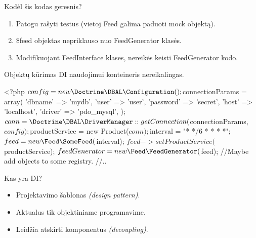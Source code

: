 \documentclass[12pt,a4paper]{beamer}
\begin{document}
\begin{frame}[fragile]{Kodėl šis kodas geresnis?}
\begin{enumerate}
    \item Patogu rašyti testus (vietoj Feed galima paduoti mock objektą).
    \item \$feed objektas nepriklauso nuo FeedGenerator klasės.
    \item Modifikuojant FeedInterface klases, nereikės keisti FeedGenerator kodo.
\end{enumerate}
\end{frame}

\begin{frame}[fragile]{Objektų kūrimas}
    DI naudojimui konteineris nereikalingas.
    \vskip0.5cm
\begin{phpcode}
    <?php
    $config = new \Doctrine\DBAL\Configuration();
    $connectionParams = array(
        'dbname' => 'mydb',
        'user' => 'user',
        'password' => 'secret',
        'host' => 'localhost',
        'driver' => 'pdo_mysql',
    );
    $conn = \Doctrine\DBAL\DriverManager::getConnection(
        $connectionParams, $config);
    $productService = new Product($conn);
    $interval = "* */6 * * * *";
    $feed = new \Feed\SomeFeed($interval);
    $feed->setProductService($productService);
    $feedGenerator = new \Feed\FeedGenerator($feed);
    //Maybe add objects to some registry.
    //..

\end{phpcode}
\end{frame}

\begin{frame}{Kas yra DI?}
    \begin{itemize}
        \item Projektavimo šablonas \emph{(design pattern)}.
        \item Aktualus tik objektiniame programavime.
        \item Leidžia atskirti komponentus \emph{(decoupling)}.
    \end{itemize}
\end{frame}
\end{document}

